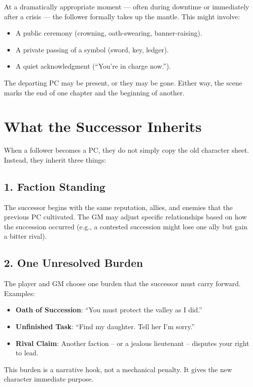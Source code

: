 At a dramatically appropriate moment --- often during downtime or immediately after a crisis --- the follower formally takes up the mantle. This might involve:
\begin{itemize}
  \item A public ceremony (crowning, oath-swearing, banner-raising).
  \item A private passing of a symbol (sword, key, ledger).
  \item A quiet acknowledgment (``You're in charge now.'').
\end{itemize}
The departing PC may be present, or they may be gone. Either way, the scene marks the end of one chapter and the beginning of another.

\section{What the Successor Inherits}
\label{sec:inheritance}

When a follower becomes a PC, they do not simply copy the old character sheet. Instead, they inherit three things:

\subsection{1. Faction Standing}
\label{subsec:inherit-standing}

The successor begins with the same reputation, allies, and enemies that the previous PC cultivated. The GM may adjust specific relationships based on how the succession occurred (e.g., a contested succession might lose one ally but gain a bitter rival).

\subsection{2. One Unresolved Burden}
\label{subsec:inherit-burden}

The player and GM choose one burden that the successor must carry forward. Examples:
\begin{itemize}
  \item \textbf{Oath of Succession}: ``You must protect the valley as I did.''
  \item \textbf{Unfinished Task}: ``Find my daughter. Tell her I'm sorry.''
  \item \textbf{Rival Claim}: Another faction -- or a jealous lieutenant -- disputes your right to lead.
\end{itemize}
This burden is a narrative hook, not a mechanical penalty. It gives the new character immediate purpose.

